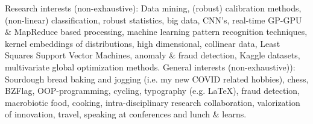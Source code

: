 \documentclass[10pt,a4paper]{article}
\begin{document}
\spacedhrule{1.6em}{-0.4em}


\inlineheadsection	
{Research interests (non-exhaustive):}
{Data mining, (robust) calibration methods, (non-linear) classification, robust statistics, big data, CNN's, real-time GP-GPU \& MapReduce based processing, machine learning pattern recognition techniques, kernel embeddings of distributions, high dimensional, collinear data, Least Squares Support Vector Machines, anomaly \& fraud detection, Kaggle datasets, multivariate global optimization methods.}
\vspace{0.5em}
\inlineheadsection	
  {General interests (non-exhaustive)):}
  {Sourdough bread baking and jogging (i.e. my new COVID related hobbies), chess, BZFlag, OOP-programming, cycling, typography (e.g. \LaTeX), fraud detection, macrobiotic food, cooking, intra-disciplinary research collaboration, valorization of innovation, travel, speaking at conferences and lunch \& learns.}
\end{document}
